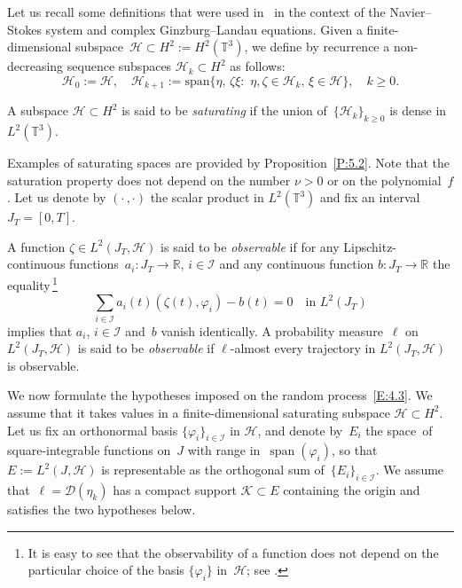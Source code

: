 \documentclass[JEP,XML,SOM,Unicode,ThmDefs]{cedram}
\let\mathcal\mathscr
\theoremstyle{plain}
\numberwithin{equation}{section}
\newcommand{\R}{{\mathbb R}}
\newcommand{\T}{{\mathbb T}}
\DeclareMathOperator{\lspan}{span}
\newcommand{\DD}{{\mathcal D}}
\newcommand{\HH}{{\mathcal H}}
\newcommand{\II}{{\mathcal I}}
\newcommand{\KK}{{\mathcal K}}
\begin{document}
Let us recall some definitions that were used in~\cite{KNS-2020} in the context of the Navier--Stokes system and complex Ginzburg--Landau equations. Given a finite-dimensional subspace~$\HH\subset H^2:=H^2(\T^3)$, we define by recurrence a non-decreasing sequence subspaces $\HH_k\subset H^2$ as follows:
\begin{equation} \label{Hk}
\HH_0:=\HH, \quad \HH_{k+1}:=\text{span}\{\eta,\,\zeta\xi: \,\,\eta,\zeta\in\HH_k,\,\xi\in\HH\},\quad k\ge0.
\end{equation}

\begin{definition}\label{D:4.1}
A subspace $\HH\subset H^2$ is said to be \emph{saturating} if the union of~$\{\HH_k\}_{k\ge0}$ is dense in~$L^2(\T^3)$.
\end{definition}

Examples of saturating spaces are provided by Proposition~\ref{P:5.2}. Note that the saturation property does not depend on the number $\nu>0$ or on the polynomial~$f$. Let us denote by $(\cdot\,,\cdot)$ the scalar product in $L^2(\T^3)$ and fix an interval $J_T=[0,T]$.

\begin{definition} \label{D:4.2}
A function $\zeta\in L^2(J_T,\HH)$ is said to be \emph{observable} if for any Lipschitz-continuous functions~$a_i:J_T\to\R$, $i\in\II$ and any continuous function $b:J_T\to\R$ the equality\,\footnote{It is easy to see that the observability of a function does not depend on the particular choice of the basis $\{\varphi_i\}$ in~$\HH$; see \cite[Rem.\,1.4]{KNS-2020}.}
\[
\sum_{i\in\II}a_i(t)(\zeta(t),\varphi_i)-b(t)=0\quad\text{in $L^2(J_T)$}
\]
implies that $a_i$, $i\in\II$ and~$b$ vanish identically. A probability measure~$\ell$ on~$L^2(J_T,\HH)$ is said to be \emph{observable} if $\ell$-almost every trajectory in $L^2(J_T,\HH)$ is observable.
\end{definition}

We now formulate the hypotheses imposed on the random process~\eqref{E:4.3}. We assume that it takes values in a finite-dimensional saturating subspace $\HH\subset H^2$. Let us fix an orthonormal basis $\{\varphi_i\}_{i\in\II}$ in $\HH$, and denote by~$E_i$ the space~of square-integrable functions on~$J$ with range in~$\lspan(\varphi_i)$, so that $E:=L^2(J,\HH)$ is representable as the orthogonal sum of~$\{E_i\}_{i\in\II}$. We assume that~$\ell=\DD(\eta_k)$ has a compact support $\KK\subset E$ containing the origin and satisfies the two hypotheses below.
\end{document}

